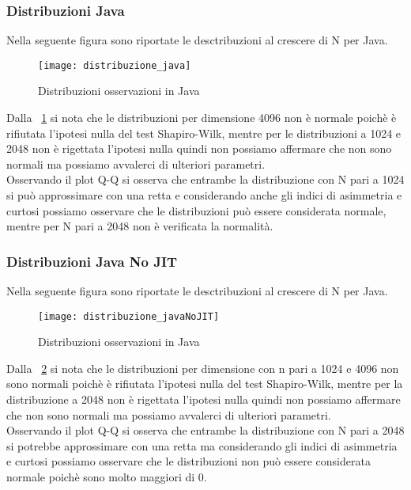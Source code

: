 \subsubsection{Distribuzioni Java}
Nella seguente figura sono riportate le desctribuzioni al crescere di N per Java.\\

\begin{figure}[!htbp]
  \texttt{[image: distribuzione\_java]}
  \caption{Distribuzioni osservazioni in Java}
  \label{distribuzione_java}
\end{figure}

Dalla \figurename~\ref{distribuzione_java} si nota
che le distribuzioni per dimensione 4096 non è normale poichè è rifiutata
l'ipotesi nulla del test Shapiro-Wilk, mentre per le distribuzioni a 1024 e 2048 non è rigettata
l'ipotesi nulla quindi non possiamo affermare che non sono normali ma possiamo avvalerci
di ulteriori parametri.\\
Osservando il plot Q-Q si osserva che entrambe la distribuzione con N pari a 1024
si può approssimare con una retta e considerando anche gli indici di asimmetria e curtosi possiamo osservare che
le distribuzioni può essere considerata normale, mentre per N pari a 2048 non è verificata la normalità.\\
\clearpage
\subsubsection{Distribuzioni Java No JIT}
Nella seguente figura sono riportate le desctribuzioni al crescere di N per Java.\\

\begin{figure}[!htbp]
  \texttt{[image: distribuzione\_javaNoJIT]}
  \caption{Distribuzioni osservazioni in Java}
  \label{distribuzione_javaNoJIT}
\end{figure}

Dalla \figurename~\ref{distribuzione_javaNoJIT} si nota
che le distribuzioni per dimensione con n pari a 1024 e 4096 non sono normali poichè è rifiutata
l'ipotesi nulla del test Shapiro-Wilk, mentre per la distribuzione a 2048 non è rigettata
l'ipotesi nulla quindi non possiamo affermare che non sono normali ma possiamo avvalerci
di ulteriori parametri.\\
Osservando il plot Q-Q si osserva che entrambe la distribuzione con N pari a 2048
si potrebbe approssimare con una retta ma considerando  gli indici di asimmetria e curtosi possiamo osservare che
le distribuzioni non può essere considerata normale poichè sono molto maggiori di 0.
\clearpage
